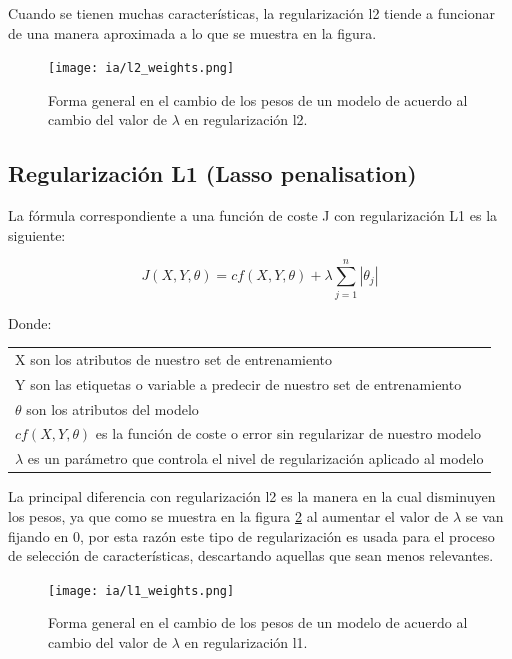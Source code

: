 \documentclass[11pt,fleqn]{book} %
\begin{document}
\FloatBarrier

Cuando se tienen muchas características, la regularización l2 tiende a funcionar de una manera aproximada a lo que se muestra en la figura.

\begin{figure}[ht]
\centering\texttt{[image: ia/l2\_weights.png]}
\caption{Forma general en el cambio de los pesos de un modelo de acuerdo al cambio del valor de $\lambda$ en regularización l2.}

\label{fig:l2_weights} 
\end{figure}

\subsection{Regularización L1 (Lasso penalisation)} 


La fórmula correspondiente a una función de coste J con regularización L1 es la siguiente:

\begin{equation}
J(X,Y,\theta) = cf(X,Y,\theta) + \lambda \sum_{j=1}^{n} | {\theta_{j}} |
\end{equation}

Donde:

\begin{tabular}{l}
	X son los atributos de nuestro set de entrenamiento\\
	Y son las etiquetas o variable a predecir de nuestro set de entrenamiento\\
	$\theta$ son los atributos del modelo\\
	$cf(X,Y,\theta)$ es la función de coste o error sin regularizar de nuestro modelo\\
	$\lambda$ es un parámetro que controla el nivel de regularización aplicado al modelo\\

\end{tabular}

La principal diferencia con regularización l2 es la manera en la cual disminuyen los pesos, ya que como se muestra en la figura \ref{fig:l1_weights} al aumentar el valor de $\lambda$ se van fijando en 0, por esta razón este tipo de regularización es usada para el proceso de selección de características, descartando aquellas que sean menos relevantes.

\begin{figure}[ht]
\centering\texttt{[image: ia/l1\_weights.png]}
\caption{Forma general en el cambio de los pesos de un modelo de acuerdo al cambio del valor de $\lambda$ en regularización l1.}

\label{fig:l1_weights} 
\end{figure}
\end{document}
